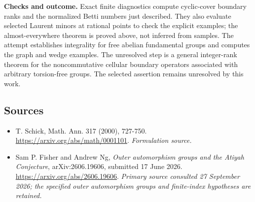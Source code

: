 \documentclass[11pt]{article}
\begin{document}
\textbf{Checks and outcome.} Exact finite diagnostics compute cyclic-cover boundary ranks and the normalized Betti numbers just described. They also evaluate selected Laurent minors at rational points to check the explicit examples; the almost-everywhere theorem is proved above, not inferred from samples. The attempt establishes integrality for free abelian fundamental groups and computes the graph and wedge examples. The unresolved step is a general integer-rank theorem for the noncommutative cellular boundary operators associated with arbitrary torsion-free groups. The selected assertion remains unresolved by this work.

\subsection{Sources}
\begin{itemize}
\item[S1]T. Schick, Math. Ann. 317 (2000), 727-750.
\url{https://arxiv.org/abs/math/0001101}.
\textit{Formulation source.}
\item[E1]Sam P. Fisher and Andrew Ng, \emph{Outer automorphism groups and the Atiyah Conjecture}, arXiv:2606.19606, submitted 17 June 2026.
\url{https://arxiv.org/abs/2606.19606}.
\textit{Primary source consulted 27 September 2026; the specified outer automorphism groups and finite-index hypotheses are retained.}
\end{itemize}
\end{document}
